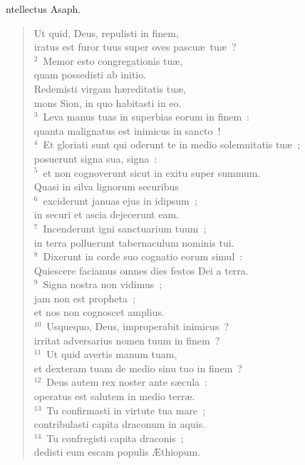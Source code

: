 \bchapter[Psalm]
ntellectus Asaph. \begin{verse}Ut quid, Deus, repulisti in finem,\\ iratus est furor tuus super oves pascu\ae\ tu\ae~?\\
${}^{2}$~Memor esto congregationis tu\ae ,\\ quam possedisti ab initio.\\ Redemisti virgam h\ae reditatis tu\ae ,\\ mons Sion, in quo habitasti in eo.\\
${}^{3}$~Leva manus tuas in superbias eorum in finem~:\\ quanta malignatus est inimicus in sancto~!\\
${}^{4}$~Et gloriati sunt qui oderunt te in medio solemnitatis tu\ae~;\\ posuerunt signa sua, signa~:\\
${}^{5}$~et non cognoverunt sicut in exitu super summum.\\ Quasi in silva lignorum securibus\\
${}^{6}$~exciderunt januas ejus in idipsum~;\\ in securi et ascia dejecerunt eam.\\
${}^{7}$~Incenderunt igni sanctuarium tuum~;\\ in terra polluerunt tabernaculum nominis tui.\\
${}^{8}$~Dixerunt in corde suo cognatio eorum simul~:\\ Quiescere faciamus omnes dies festos Dei a terra.\\
${}^{9}$~Signa nostra non vidimus~;\\ jam non est propheta~;\\ et nos non cognoscet amplius.\\
${}^{10}$~Usquequo, Deus, improperabit inimicus~?\\ irritat adversarius nomen tuum in finem~?\\
${}^{11}$~Ut quid avertis manum tuam,\\ et dexteram tuam de medio sinu tuo in finem~?\\
${}^{12}$~Deus autem rex noster ante s\ae cula~:\\ operatus est salutem in medio terr\ae .\\
${}^{13}$~Tu confirmasti in virtute tua mare~;\\ contribulasti capita draconum in aquis.\\
${}^{14}$~Tu confregisti capita draconis~;\\ dedisti eum escam populis \AE thiopum.\\

\end{verse}
